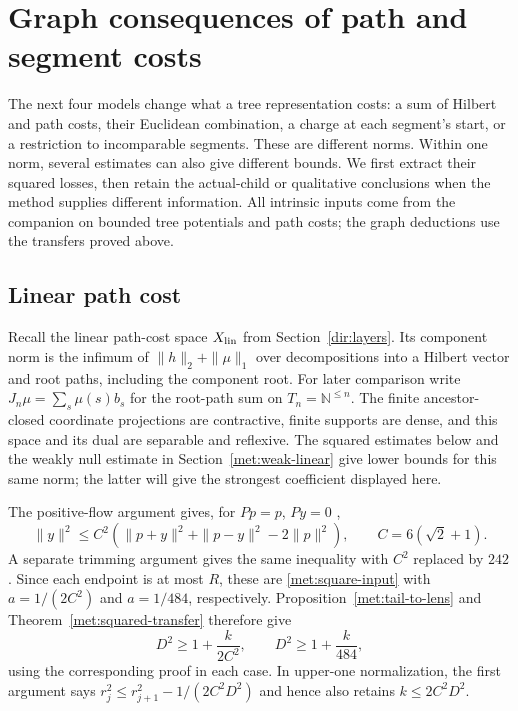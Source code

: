 \section{Graph consequences of path and segment costs}\label{met:d-section}
The next four models change what a tree representation costs: a sum of
Hilbert and path costs, their Euclidean combination, a charge at each
segment's start, or a restriction to incomparable segments. These are
different norms. Within one norm, several estimates can also give
different bounds. We first extract their squared losses, then retain
the actual-child or qualitative conclusions when the method supplies
different information. All intrinsic inputs come from the companion on
bounded tree potentials and path costs; the graph deductions use the
transfers proved above.

\subsection{Linear path cost}\label{met:linear-section}
Recall the linear path-cost space $X_{\rm lin}$ from
Section~\ref{dir:layers}. Its component norm is the infimum of
$\|h\|_2+\|\mu\|_1$ over decompositions into a Hilbert vector and
root paths, including the component root. For later comparison write
$J_n\mu=\sum_s\mu(s)b_s$ for the root-path sum on
$T_n=\mathbb N^{\le n}$.
The finite ancestor-closed coordinate projections are contractive,
finite supports are dense, and this space and its dual are separable and
reflexive. The squared estimates below and the weakly null estimate in
Section~\ref{met:weak-linear} give lower bounds for this same norm;
the latter will give the strongest coefficient displayed here.

The positive-flow argument gives, for $Pp=p$, $Py=0$
\cite[Theorem~5.7]{TreePotentials},
\begin{equation}\label{met:linear-flow-input}
 \|y\|^2\le C^2(\|p+y\|^2+\|p-y\|^2-2\|p\|^2),
 \qquad C=6(\sqrt2+1).
\end{equation}
A separate trimming argument \cite[Theorem~5.10]{TreePotentials}
gives the same inequality with $C^2$
replaced by $242$. Since each endpoint is at most $R$, these are
\eqref{met:square-input} with $a=1/(2C^2)$ and $a=1/484$,
respectively. Proposition~\ref{met:tail-to-lens} and
Theorem~\ref{met:squared-transfer} therefore give
\begin{equation}\label{met:linear-flow-graph}
 D^2\ge1+\frac{k}{2C^2},\qquad
 D^2\ge1+\frac{k}{484},
\end{equation}
using the corresponding proof in each case. In upper-one normalization,
the first argument says $r_j^2\le r_{j+1}^2-1/(2C^2D^2)$ and hence
also retains $k\le2C^2D^2$.

